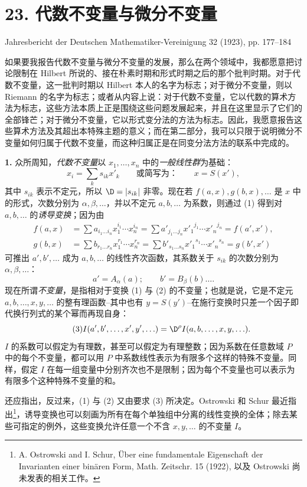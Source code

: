 \section*{23. 代数不变量与微分不变量}
\begin{center}
Jahresbericht der Deutschen Mathematiker-Vereinigung 32 (1923), pp. 177--184
\end{center}

如果要我报告代数不变量与微分不变量的发展，那么在两个领域中，我都愿意把讨论限制在 Hilbert 所说的、接在朴素时期和形式时期之后的那个批判时期。对于代数不变量，这一批判时期以 Hilbert 本人的名字为标志；对于微分不变量，则以 Riemann 的名字为标志；或者从内容上说：对于代数不变量，它以代数的算术方法为标志，这些方法本质上正是围绕这些问题发展起来，并且在这里显示了它们的全部锋芒；对于微分不变量，它以形式变分法的方法为标志。因此，我愿意报告这些算术方法及其超出本特殊主题的意义；而在第二部分，我可以只限于说明微分不变量如何归属于代数不变量，而这种归属正是在同变分法方法的联系中完成的。

\textbf{1.} 众所周知，\emph{代数不变量}以 $x_1,\ldots,x_n$ 中的\emph{一般线性群}为基础：
\[
\tag{1}
x_i=\sum_k s_{ik}x'_k
\qquad\text{或简写为：}\qquad
x=S(x'),
\]
其中 $s_{ik}$ 表示不定元，所以 $\D=|s_{ik}|$ 非零。现在若 $f(a,x),g(b,x),\ldots$ 是 $x$ 中的形式，次数分别为 $\alpha,\beta,\ldots$，并以不定元 $a,b,\ldots$ 为系数，则通过 (1) 得到对 $a,b,\ldots$ 的\emph{诱导变换}；因为由
\[
\begin{aligned}
f(a,x)&=\sum a_{i_1\ldots i_n}x_1^{i_1}\cdots x_n^{i_n}
      =\sum a'_{j_1\ldots j_n}{x'_1}^{j_1}\cdots {x'_n}^{j_n}
      =f(a',x'),\\
g(b,x)&=\sum b_{r_1\ldots r_n}x_1^{r_1}\cdots x_n^{r_n}
      =\sum b'_{s_1\ldots s_n}{x'_1}^{s_1}\cdots {x'_n}^{s_n}
      =g(b',x')
\end{aligned}
\]
可推出 $a',b',\ldots$ 成为 $a,b,\ldots$ 的线性齐次函数，其系数关于 $s_{ik}$ 的次数分别为 $\alpha,\beta,\ldots$：
\[
\tag{2}
a'=A_\alpha(a);\qquad b'=B_\beta(b)\ldots .
\]
现在所谓\emph{不变量}，是指相对于变换 (1) 与 (2) 的不变量；也就是说，它是不定元 $a,b,\ldots,x,y,\ldots$ 的整有理函数--其中也有 $y=S(y')$--在施行变换时只差一个因子即代换行列式的某个幂而再现自身：
\[
\tag{3}
I(a',b',\ldots,x',y',\ldots)=\D^\rho I(a,b,\ldots,x,y,\ldots).
\]
$I$ 的系数可以假定为有理数，甚至可以假定为有理整数；因为系数在任意数域 $P$ 中的每个不变量，都可以用 $P$ 中系数线性表示为有限多个这样的特殊不变量。同样，假定 $I$ 在每一组变量中分别齐次也不是限制；因为每个不变量也可以表示为有限多个这种特殊不变量的和。

还应指出，反过来，(1) 与 (2) 又由要求 (3) 所决定。Ostrowski 和 Schur 最近指出\footnote{A. Ostrowski and I. Schur, Über eine fundamentale Eigenschaft der Invarianten einer binären Form, Math. Zeitschr. 15 (1922), 以及 Ostrowski 尚未发表的相关工作。}，诱导变换也可以刻画为所有在每个单独组中分离的线性变换的全体；除去某些可指定的例外，这些变换允许任意一个不含 $x,y,\ldots$ 的不变量 $I$。

